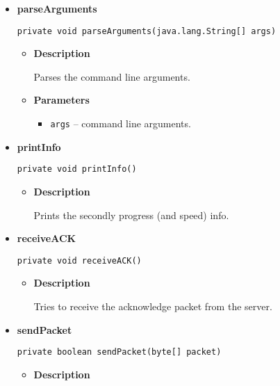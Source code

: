 {{{{\begin{itemize}
{\begin{itemize}
{Calls Client(args) and thereby starts the client.
}
\item{
{\bf  Parameters}
  \begin{itemize}
   \item{
\texttt{args} -- command line arguments}
  \end{itemize}
}%
\end{itemize}
}%
\item{ 
\hypertarget{filetransferUDP.Client.parseArguments(java.lang.String[])}{{\bf  parseArguments}\\}
\begin{lstlisting}[frame=none]
private void parseArguments(java.lang.String[] args)\end{lstlisting} %
\begin{itemize}
\item{
{\bf  Description}

Parses the command line arguments.
}
\item{
{\bf  Parameters}
  \begin{itemize}
   \item{
\texttt{args} -- command line arguments.}
  \end{itemize}
}%
\end{itemize}
}%
\item{ 
\hypertarget{filetransferUDP.Client.printInfo()}{{\bf  printInfo}\\}
\begin{lstlisting}[frame=none]
private void printInfo()\end{lstlisting} %
\begin{itemize}
\item{
{\bf  Description}

Prints the secondly progress (and speed) info.
}
\end{itemize}
}%
\item{ 
\hypertarget{filetransferUDP.Client.receiveACK()}{{\bf  receiveACK}\\}
\begin{lstlisting}[frame=none]
private void receiveACK()\end{lstlisting} %
\begin{itemize}
\item{
{\bf  Description}

Tries to receive the acknowledge packet from the server.
}
\end{itemize}
}%
\item{ 
\hypertarget{filetransferUDP.Client.sendPacket(byte[])}{{\bf  sendPacket}\\}
\begin{lstlisting}[frame=none]
private boolean sendPacket(byte[] packet)\end{lstlisting} %
\begin{itemize}
\item{
{\bf  Description}

}
\end{itemize}}
\end{itemize}}}}}
